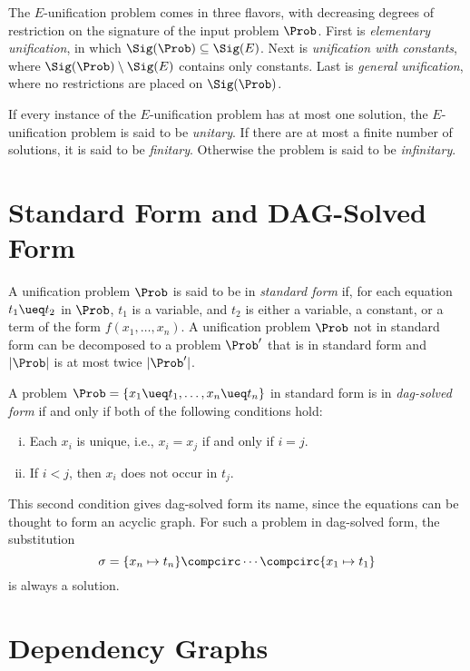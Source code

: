 The $E$-unification problem comes in three flavors, with decreasing degrees of
restriction on the signature of the input problem $\Prob$. First is
\emph{elementary unification}, in which $\Sig(\Prob) \subseteq \Sig(E)$. Next
is \emph{unification with constants}, where $\Sig(\Prob) \setminus \Sig(E)$
contains only constants. Last is \emph{general unification}, where no
restrictions are placed on $\Sig(\Prob)$.

If every instance of the $E$-unification problem has at most one solution, the
$E$-unification problem is said to be \emph{unitary}. If there are at most a
finite number of solutions, it is said to be \emph{finitary}. Otherwise the
problem is said to be \emph{infinitary}.

\section{Standard Form and DAG-Solved Form}\label{sec:std-form}

A unification problem $\Prob$ is said to be in \emph{standard form} if, for
each equation $t_1 \ueq t_2$ in $\Prob$, $t_1$ is a variable, and $t_2$ is
either a variable, a constant, or a term of the form $f(x_1, \dotsc, x_n)$. A
unification problem $\Prob$ not in standard form can be decomposed to a problem
$\Prob'$ that is in standard form and $|\Prob|$ is at most twice $|\Prob'|$.

A problem $\Prob = \{ x_1 \ueq t_1, \dotsc, x_n \ueq t_n \}$ in standard form
is in \emph{dag-solved form} if and only if both of the following conditions
hold:

\begin{enumerate}[(i)]
    \item Each $x_i$ is unique, i.e., $x_i = x_j$ if and only if $i = j$.
    \item If $i < j$, then $x_i$ does not occur in $t_j$.
\end{enumerate}

This second condition gives dag-solved form its name, since the equations can
be thought to form an acyclic graph. For such a problem in
dag-solved form, the substitution
\[\sigma = \{ x_n \mapsto t_n \} \compcirc \dotsb \compcirc \{ x_1 \mapsto t_1 \}\]
is always a solution.

\section{Dependency Graphs}\label{sec:dep-graphs}

